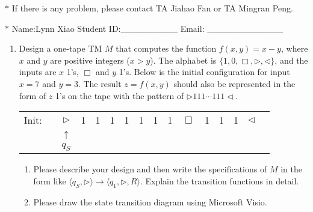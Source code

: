 \documentclass[12pt,a4paper]{article}
\theoremstyle{definition}
\begin{document}
\noindent

\noindent{}
\begin{center}
\footnotesize{\color{red}$*$ If there is any problem, please contact TA Jiahao Fan or TA Mingran Peng.}

\footnotesize{\color{blue}$*$ Name:Lynn Xiao  \quad Student ID:\_\_\_\_\_\_\_\_\_ \quad Email: \_\_\_\_\_\_\_\_\_\_\_\_}
\end{center}

\begin{enumerate}
    \item
    Design a one-tape TM $M$ that computes the function $f(x, y) = x - y$, where $x$ and $y$ are positive integers ($x > y$). The alphabet is $\{1, 0, \Box, \triangleright, \triangleleft\}$, and the inputs are $x$ 1's, $\Box$ and $y$ 1's. Below is the initial configuration for input $x=7$ and $y=3$. The result $z=f(x, y)$ should also be represented in the form of $z$ 1's on the tape with the pattern of $\triangleright 111 \cdots 111 \triangleleft$.

    \begin{center}
    \begin{tabular}{ll|c|c|c|c|c|c|c|c|c|c|c|c|c|c}
    	\cline{2-16}
    	Init:& & $\triangleright$ &  1  & 1 & 1 & 1 & 1 & 1 & 1 & $\Box$ & 1 & 1 & 1 & $ \triangleleft$ & \\
    	\cline{2-16}
    	\multicolumn{2}{c}{} & \multicolumn{1}{c}{$\uparrow$} & \multicolumn{11}{c}{}\\
    	\multicolumn{2}{c}{} & \multicolumn{1}{c}{$q_S$} & \multicolumn{11}{c}{}\\
    \end{tabular}
    \end{center}

    \begin{enumerate}
        \item
        Please describe your design and then write the specifications of $M$ in the form like $\langle q_S, \triangleright \rangle \rightarrow \langle q_1, \triangleright,  R\rangle$. Explain the transition functions in detail.

        \item
        Please draw the state transition diagram using Microsoft Visio.


\end{enumerate}
\end{enumerate}
\end{document}
